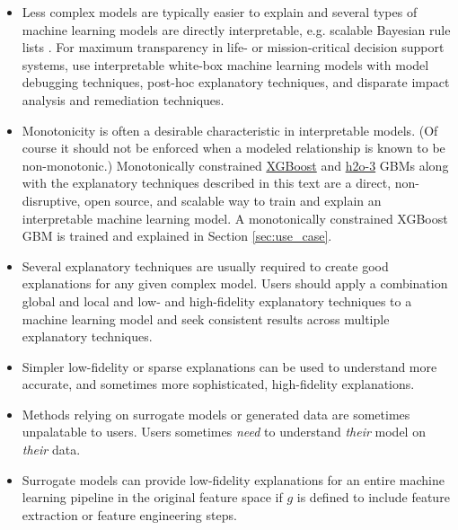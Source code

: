\documentclass[sigconf]{acmart}
\begin{document}
\begin{itemize}	
	
	\item Less complex models are typically easier to explain and several types of machine learning models are directly interpretable, e.g. scalable Bayesian rule lists \cite{sbrl}. For maximum transparency in life- or mission-critical decision support systems, use interpretable white-box machine learning models with model debugging techniques, post-hoc explanatory techniques, and disparate impact analysis and remediation techniques. \\
	
	\item Monotonicity is often a desirable characteristic in interpretable models. (Of course it should not be enforced when a modeled relationship is known to be non-monotonic.) Monotonically constrained \href{https://github.com/dmlc/xgboost}{XGBoost} and \href{https://github.com/h2oai/h2o-3}{h2o-3} GBMs along with the explanatory techniques described in this text are a direct, non-disruptive, open source, and scalable way to train and explain an interpretable machine learning model. A monotonically constrained XGBoost GBM is trained and explained in Section \ref{sec:use_case}.\\
	
	\item Several explanatory techniques are usually required to create good explanations for any given complex model. Users should apply a combination global and local and low- and high-fidelity explanatory techniques to a machine learning model and seek consistent results across multiple explanatory techniques. \\
	
	\item Simpler low-fidelity or sparse explanations can be used to understand more accurate, and sometimes more sophisticated, high-fidelity explanations. \\ 

	\item Methods relying on surrogate models or generated data are sometimes unpalatable to users. Users sometimes \textit{need} to understand \textit{their} model on \textit{their} data.\\
	
	\item Surrogate models can provide low-fidelity explanations for an entire machine learning pipeline in the original feature space if $g$ is defined to include feature extraction or feature engineering steps.\\
	

\end{itemize}
\end{document}
